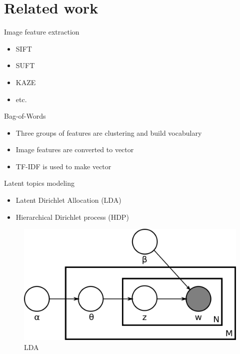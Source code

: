 \documentclass{beamer}
\begin{document}
\section{Related work}
\begin{frame}{Image feature extraction}
    \begin{itemize}
        \item<1-> SIFT
        \item<2-> SUFT
        \item<3-> KAZE
        \item<4-> etc.
    \end{itemize}
\end{frame}

\begin{frame}{Bag-of-Words}
    \begin{itemize}
        \item Three groups of features are clustering and build vocabulary
        \item Image features are converted to vector
        \item TF-IDF is used to make vector
    \end{itemize}
\end{frame}

\begin{frame}{Latent topics modeling}
    \begin{itemize}
        \item<1-> Latent Dirichlet Allocation (LDA)
        \item<2-> Hierarchical Dirichlet process (HDP)
    \end{itemize}
    
    \begin{figure}
        \centering
        \includegraphics[width=.6\textwidth]{Latent_Dirichlet_allocation.png}
        \caption{LDA}
        \label{fig:LDA}
    \end{figure}
\end{frame}
\end{document}
